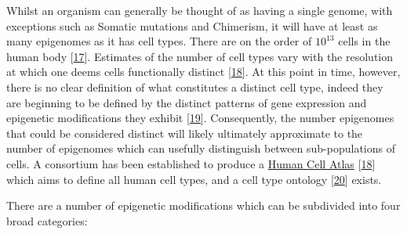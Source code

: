 \documentclass[
]{book}
\begin{document}
Whilst an organism can generally be thought of as having a single genome, with exceptions such as Somatic mutations and Chimerism, it will have at least as many epigenomes as it has cell types.
There are on the order of \(10^{13}\) cells in the human body {[}\protect\hyperlink{ref-Bianconi2013}{17}{]}.
Estimates of the number of cell types vary with the resolution at which one deems cells functionally distinct {[}\protect\hyperlink{ref-Regev2017}{18}{]}.
At this point in time, however, there is no clear definition of what constitutes a distinct cell type, indeed they are beginning to be defined by the distinct patterns of gene expression and epigenetic modifications they exhibit {[}\protect\hyperlink{ref-CellSystemsCellType2017}{19}{]}.
Consequently, the number epigenomes that could be considered distinct will likely ultimately approximate to the number of epigenomes which can usefully distinguish between sub-populations of cells.
A consortium has been established to produce a \href{www.humancellatlas.org}{Human Cell Atlas} {[}\protect\hyperlink{ref-Regev2017}{18}{]} which aims to define all human cell types, and a cell type ontology {[}\protect\hyperlink{ref-CellOntologyOBO}{20}{]} exists.

There are a number of epigenetic modifications which can be subdivided into four broad categories:
\end{document}
